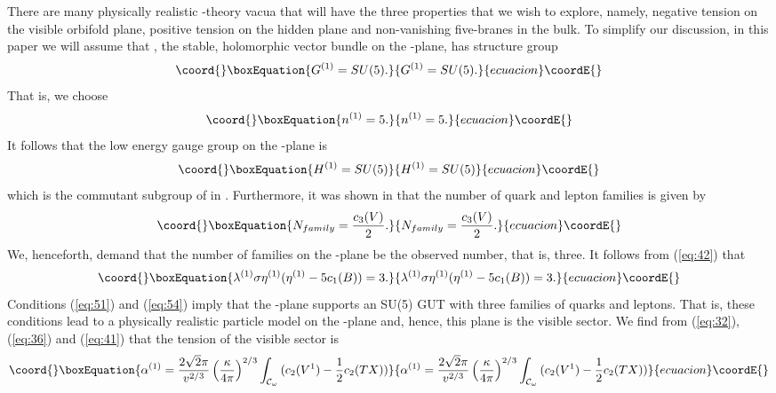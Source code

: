 \documentclass[a4paper,12pt]{article}
\numberwithin{equation}{section}
\theoremstyle{plain}
\begin{document}
There are many  physically realistic \coordHE{}-theory vacua that will
have the three properties that we wish to explore, namely, negative tension on
the visible orbifold plane, positive tension on the hidden plane and
non-vanishing five-branes in the bulk. To simplify our discussion, in this
paper we will assume that \coordHE{}, the stable, holomorphic vector bundle on
the \coordHE{}-plane, has structure group 
%
\begin{equation}\coord{}\boxEquation{
G^{(1)}=SU(5).
\label{eq:50}
}{
G^{(1)}=SU(5).
}{ecuacion}\coordE{}\end{equation}
%
That is, we choose
%
\begin{equation}\coord{}\boxEquation{
n^{(1)}=5.
\label{eq:51}
}{
n^{(1)}=5.
}{ecuacion}\coordE{}\end{equation}
%
It follows that the low energy gauge group on the \coordHE{}-plane is
%
\begin{equation}\coord{}\boxEquation{
H^{(1)}=SU(5)
\label{eq:52}
}{
H^{(1)}=SU(5)
}{ecuacion}\coordE{}\end{equation}
%
which is the commutant subgroup of \coordHE{} in \coordHE{}.
Furthermore, it was shown in \cite{C} that the number 
of quark and lepton families is given by
%
\begin{equation}\coord{}\boxEquation{
N_{family}=\frac{c_{3}(V)}{2}.
\label{eq:53}
}{
N_{family}=\frac{c_{3}(V)}{2}.
}{ecuacion}\coordE{}\end{equation}
%
We, henceforth, demand that the number of families on the \coordHE{}-plane be the
observed number, that is, three. It follows from (\ref{eq:42}) that
%
\begin{equation}\coord{}\boxEquation{
\lambda^{(1)} \sigma \eta^{(1)}(\eta^{(1)}-5c_{1}(B))=3.
\label{eq:54}
}{
\lambda^{(1)} \sigma \eta^{(1)}(\eta^{(1)}-5c_{1}(B))=3.
}{ecuacion}\coordE{}\end{equation}
%
Conditions (\ref{eq:51}) and (\ref{eq:54}) imply that the \coordHE{}-plane supports 
an SU(5) GUT with three families of quarks and leptons. That is, these conditions
lead to a physically realistic particle model on the \coordHE{}-plane and, hence, this
plane is the visible sector. We find from (\ref{eq:32}), (\ref{eq:36}) 
and (\ref{eq:41}) that the tension of the visible sector is
%
\begin{equation}\coord{}\boxEquation{
\alpha^{(1)}=\frac{2\sqrt{2}\pi}{v^{2/3}}\left(\frac{\kappa}{4\pi}\right)^{2/3}
\int_{{\cal{C}}_{\omega}}{(c_{2}(V^{1})-\frac{1}{2}c_{2}(TX))}
\label{eq:55}
}{
\alpha^{(1)}=\frac{2\sqrt{2}\pi}{v^{2/3}}\left(\frac{\kappa}{4\pi}\right)^{2/3}
\int_{{\cal{C}}_{\omega}}{(c_{2}(V^{1})-\frac{1}{2}c_{2}(TX))}
}{ecuacion}\coordE{}\end{equation}
\end{document}
